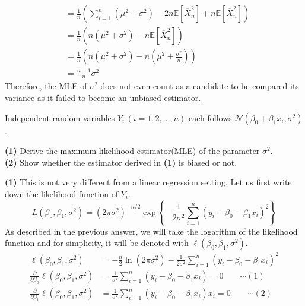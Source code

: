 \documentclass[answers]{exam}
\begin{document}
\begin{questions}
\begin{solution}
\begin{align*}
         &= \frac{1}{n}\left(\sum_{i=1}^{n}\left(\mu^{2}+\sigma^{2}\right) - 2n\mathbb{E}\left[\overline{X}_{n}^{2}\right] + n\mathbb{E}\left[\overline{X}_{n}^{2}\right]\right)\\
         &= \frac{1}{n}\left(n\left(\mu^{2}+\sigma^{2}\right)-n\mathbb{E}\left[\overline{X}_{n}^{2}\right] \right)\\
         &= \frac{1}{n}\left(n\left(\mu^{2}+\sigma^{2}\right) - n\left(\mu^{2}+\frac{\sigma^{2}}{n}\right) \right)\\
         &= \frac{n-1}{n}\sigma^{2}
      \end{align*}
      Therefore, the MLE of $\sigma^{2}$ does not even count as a candidate to be compared its variance as it failed to become an unbiased estimator.
   \end{solution}
   \question
   Independent random variables $Y_{i}\,\left(i=1,2,\ldots , n\right)$ each follows $\mathcal{N}\left(\beta_{0}+\beta_{1}x_{i}, \sigma^{2}\right)$.\par
   \textbf{(1)} Derive the maximum likelihood estimator(MLE) of the parameter $\sigma^{2}$.\\
   \textbf{(2)} Show whether the estimator derived in \textbf{(1)} is biased or not.
   \begin{solution}
      \textbf{(1)} This is not very different from a linear regression setting. Let us first write down the likelihood function of $Y_{i}$.
      $$
         L\left(\beta_{0}, \beta_{1}, \sigma^{2}\right) = \left(2\pi\sigma^{2}\right)^{-n/2}\exp\left\{-\frac{1}{2\sigma^{2}}\sum_{i=1}^{n}\left(y_{i}-\beta_{0}-\beta_{1}x_{i}\right)^{2} \right\}
      $$
      As described in the previous answer, we will take the logarithm of the likelihood function and for simplicity, it will be denoted with $\ell\left(\beta_{0},\beta_{1},\sigma^{2}\right)$.
      \begin{align*}
         \ell\left(\beta_{0}, \beta_{1},\sigma^{2}\right) &= -\frac{n}{2}\ln\left(2\pi\sigma^{2}\right) -\frac{1}{2\sigma^{2}}\sum_{i=1}^{n}\left(y_{i}-\beta_{0}-\beta_{1}x_{i}\right)^{2}\\
         \frac{\partial}{\partial \beta_{0}}\ell\left(\beta_{0},\beta_{1},\sigma^{2}\right) &= \frac{1}{\sigma^{2}}\sum_{i=1}^{n}\left(y_{i}-\beta_{0}-\beta_{1}x_{i}\right)=0 \qquad \cdots (1)\\
         \frac{\partial}{\partial \beta_{1}}\ell\left(\beta_{0},\beta_{1},\sigma^{2}\right) &= \frac{1}{\sigma^{2}}\sum_{i=1}^{n}\left(y_{i}-\beta_{0}-\beta_{1}x_{i}\right)x_{i}=0 \qquad \cdots (2)\\

\end{align*}
\end{solution}
\end{questions}
\end{document}
